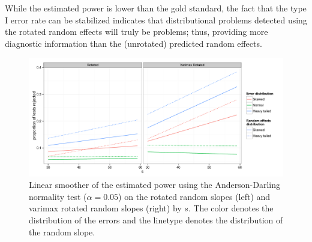 \documentclass[12pt]{article} %
\begin{document}
While the estimated power is lower than the gold standard, the fact that the type I error rate can be stabilized indicates that distributional problems detected using the rotated random effects will truly be problems; thus, providing more diagnostic information than the (unrotated) predicted random effects.


\begin{figure}
	\centering
	\includegraphics[width=\textwidth]{ad_slope_power.pdf}
	\caption{\label{fig:power-slope}Linear smoother of the estimated power using the Anderson-Darling normality test ($\alpha = 0.05$) on the rotated random slopes (left) and varimax rotated random slopes (right) by $s$. The color denotes the distribution of the errors and the linetype denotes the distribution of the random slope.}
\end{figure}
\end{document}
